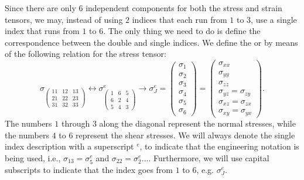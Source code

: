 Since there are only $6$ independent components for both the stress and strain tensors, we may, instead of using $2$ indices that each run from $1$ to $3$, use a single index that runs from $1$ to $6$.  The only thing we need to do is define the correspondence between the double and single indices.  We define the  or  by means of the following relation for the stress tensor:
\begin{equation}
	\sigma_{\left(\begin{matrix}
	11  &  12  &  13 \\
	21  &  22  &  23 \\
	31  &  32  &  33 \end{matrix}\right)}
	\leftrightarrow
	\sigma^e_{\left(\begin{matrix}
	1  &  6  &  5 \\
	6  &  2  &  4 \\
	5  &  4  &  3 \end{matrix}\right)}\rightarrow \sigma^e_J = \left(\begin{matrix}
	\sigma_{1}\\ \sigma_{2}\\ \sigma_{3}\\ \sigma_{4}\\ \sigma_{5}\\ \sigma_{6}\end{matrix}\right) 
	= \left(\begin{matrix}
	\sigma_{xx}\\ \sigma_{yy}\\ \sigma_{zz}\\ \sigma_{yz}=\sigma_{zy}\\ \sigma_{xz}=\sigma_{zx}\\ \sigma_{xy}=\sigma_{yx}\end{matrix}\right). 
\end{equation}	
The numbers $1$ through $3$ along the diagonal represent the normal stresses, while the numbers $4$ to $6$ represent the shear stresses.  We will always denote the single index description with a superscript $^e$, to indicate that the engineering notation is being used, i.e., $\sigma_{13} = \sigma^e_5$ and $\sigma_{22} = \sigma^e_2\ldots$. Furthermore, we will use capital subscripts to indicate that the index goes from $1$ to $6$, e.g. $\sigma^e_J$.

